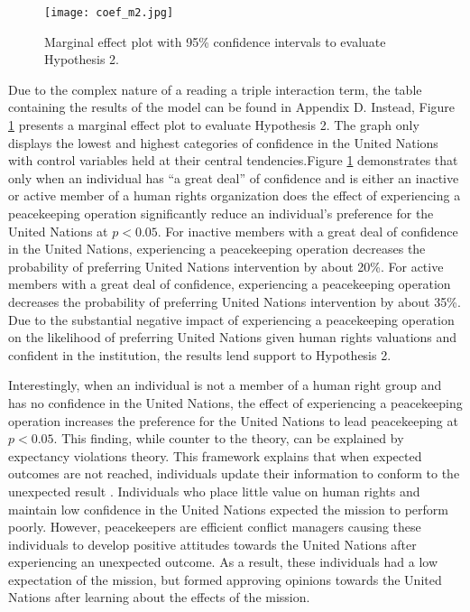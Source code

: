 \documentclass[12pt]{article}
\newcommand{\UN}[1]{United Nations}
\newcommand{\PKO}[1]{peacekeeping operation}
\begin{document}
\begin{figure}[h!]
\begin{centering}
\texttt{[image: coef\_m2.jpg]}
\caption{\small Marginal effect plot with 95\% confidence intervals to evaluate Hypothesis 2.}
\label{figure 2}
\end{centering}
\end{figure}

Due to the complex nature of a reading a triple interaction term, the table containing the results of the model can be found in Appendix D. Instead, Figure \ref{figure 2} presents a marginal effect plot to evaluate Hypothesis 2. The graph only displays the lowest and highest categories of confidence in the \UN{} with control variables held at their central tendencies.\footnotemark[12] Figure \ref{figure 2} demonstrates that only when an individual has ``a great deal'' of confidence and is either an inactive or active member of a human rights organization does the effect of experiencing a \PKO{} significantly reduce an individual's preference for the \UN{} at $p < 0.05$. For inactive members with a great deal of confidence in the \UN{}, experiencing a \PKO{} decreases the probability of preferring \UN{} intervention by about 20\%. For active members with a great deal of confidence, experiencing a \PKO{} decreases the probability of preferring \UN{} intervention by about 35\%. Due to the substantial negative impact of experiencing a \PKO{} on the likelihood of preferring \UN{} given human rights valuations and confident in the institution, the results lend support to Hypothesis 2. 

Interestingly, when an individual is not a member of a human right group and has no confidence in the \UN{}, the effect of experiencing a \PKO{} increases the preference for the \UN{} to lead peacekeeping at $p < 0.05$. This finding, while counter to the theory, can be explained by expectancy violations theory. This framework explains that when expected outcomes are not reached, individuals update their information to conform to the unexpected result \citep{johnston2015emotion,niven2000other}. Individuals who place little value on human rights and maintain low confidence in the \UN{} expected the mission to perform poorly. However, peacekeepers are efficient conflict managers \citep{fortna2004interstate} causing these individuals to develop positive attitudes towards the \UN{} after experiencing an unexpected outcome. As a result, these individuals had a low expectation of the mission, but formed approving opinions towards the \UN{} after learning about the effects of the mission. 
\end{document}
